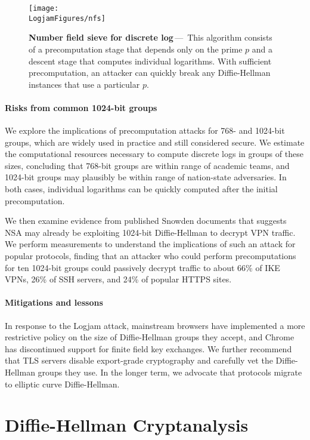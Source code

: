 \begin{figure*}[ht]
\centering\texttt{[image: \\LogjamFigures/nfs]}

\caption{\textbf{Number field sieve for discrete log}\,---\,%
This algorithm consists of a precomputation stage that depends only on the
prime $p$ and a descent stage that computes individual logarithms. With
sufficient precomputation, an attacker can quickly break any Diffie-Hellman
instances that use a particular $p$.
}
\label{fig:nfs}
\end{figure*}

\paragraph{Risks from common 1024-bit groups}
We explore the implications of precomputation attacks for 768- and 1024-bit
groups, which are widely used in practice and still considered secure. We
estimate the computational resources necessary to compute discrete logs in
groups of these sizes, concluding that 768-bit groups are within range of
academic teams, and 1024-bit groups may plausibly be within range of
nation-state adversaries. In both cases, individual logarithms can be quickly
computed after the initial precomputation.

We then examine evidence from published Snowden documents that suggests NSA
may already be exploiting 1024-bit Diffie-Hellman to decrypt VPN traffic. We
perform measurements to understand the implications of such an attack for
popular protocols, finding that an attacker who could perform precomputations
for ten 1024-bit groups could passively decrypt traffic to about 66\% of IKE
VPNs, 26\% of SSH servers, and 24\% of popular HTTPS sites.

\paragraph{Mitigations and lessons}
In response to the Logjam attack, mainstream browsers have implemented a more
restrictive policy on the size of Diffie-Hellman groups they accept, and
Chrome has discontinued support for finite field key exchanges. We further
recommend that TLS servers disable export-grade cryptography and carefully
vet the Diffie-Hellman groups they use. In the longer term, we advocate that
protocols migrate to elliptic curve Diffie-Hellman.

\section{Diffie-Hellman Cryptanalysis}
\label{sec:dl}

